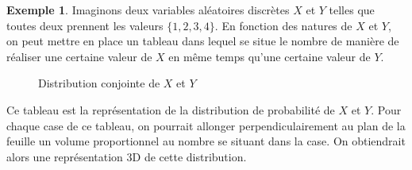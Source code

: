 \documentclass[a4paper,12pt]{report}
\theoremstyle{definition}
\renewcommand{\(}{\left(}
\renewcommand{\)}{\right)}
\newtheorem{exmp}[thm]{Exemple}
\begin{document}
        \begin{exmp}
            Imaginons deux variables aléatoires discrètes $X$ et $Y$ telles que toutes deux prennent les valeurs $\{1,2,3,4\}$. En fonction des natures de $X$ et $Y$, on peut mettre en place un tableau dans lequel se situe le nombre de manière de réaliser une certaine valeur de $X$ en même temps qu'une certaine valeur de $Y$.
            
            \begin{figure}[H]
                \centering
                \caption{Distribution conjointe de $X$ et $Y$}
            \end{figure}
            Ce tableau est la représentation de la distribution de probabilité de $X$ et $Y$. Pour chaque case de ce tableau, on pourrait allonger perpendiculairement au plan de la feuille un volume proportionnel au nombre se situant dans la case. On obtiendrait alors une représentation 3D de cette distribution.
            

\end{exmp}
\end{document}
